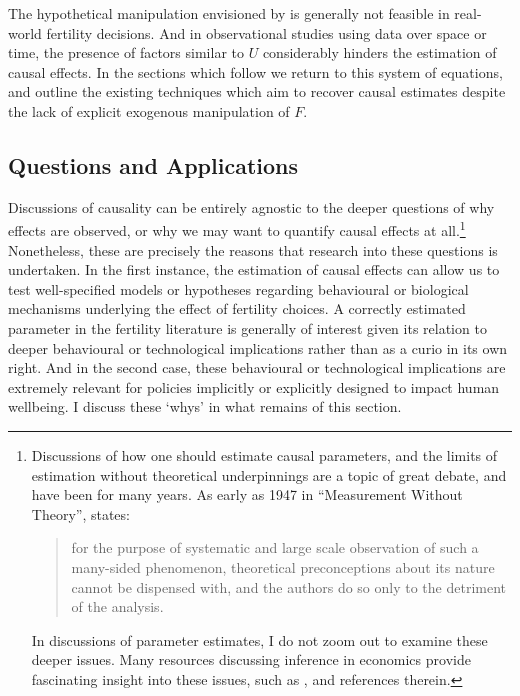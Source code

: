 The hypothetical manipulation envisioned by \citeauthor{Haavelmo1943} is 
generally not feasible in real-world fertility decisions. And in observational
studies using data over space or time, the presence of factors similar to $U$
considerably hinders the estimation of causal effects.  In the sections which
follow we return to this system of equations, and outline the existing 
techniques which aim to recover causal estimates despite the lack of explicit 
exogenous manipulation of $F$.

\subsection{Questions and Applications}
Discussions of causality can be entirely agnostic to the deeper questions of
why effects are observed, or why we may want to quantify causal effects at 
all.\footnote{Discussions of how one should estimate causal parameters, and 
the limits of estimation without theoretical underpinnings are a topic of great 
debate, and have been for many years. As early as 1947 in ``Measurement Without 
Theory'', \citeauthor{Koopmans1947} states: 
\begin{quote}
for the purpose of systematic and large scale observation of such a many-sided 
phenomenon, theoretical preconceptions about its nature cannot be dispensed with, 
and the authors do so only to the detriment of the analysis.
\end{quote}
In discussions of parameter estimates, I do not zoom out to examine these
deeper issues.  Many resources discussing inference in economics provide 
fascinating insight into these issues, such as \citet{Keane2010}, 
\citet{Wolpin2013} and references therein.}  Nonetheless, these are precisely 
the reasons that research into these questions is undertaken.  In the first 
instance, the estimation of causal effects can allow us to test well-specified 
models or hypotheses regarding behavioural or biological mechanisms underlying
the effect of fertility choices. A correctly estimated parameter in the 
fertility literature is generally of interest given its relation to deeper 
behavioural or technological implications rather than as a curio in its own 
right.  And in the second case, these behavioural or technological implications 
are extremely relevant for policies implicitly or explicitly designed to impact 
human wellbeing.  I discuss these `whys' in what remains of this section.

